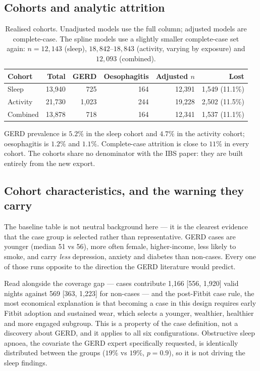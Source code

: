 \documentclass[11pt]{article}
\begin{document}
\subsection{Cohorts and analytic attrition}
\begin{table}[h]
\centering
\footnotesize
\begin{tabular}{@{}lrrrrr@{}}
\toprule
\textbf{Cohort} & \textbf{Total} & \textbf{GERD} & \textbf{Oesophagitis} & \textbf{Adjusted $n$} & \textbf{Lost} \\
\midrule
Sleep    & 13{,}940 & 725     & 164 & 12{,}391 & 1{,}549 (11.1\%) \\
Activity & 21{,}730 & 1{,}023 & 244 & 19{,}228 & 2{,}502 (11.5\%) \\
Combined & 13{,}878 & 718     & 164 & 12{,}341 & 1{,}537 (11.1\%) \\
\bottomrule
\end{tabular}
\caption{Realised cohorts. Unadjusted models use the full column; adjusted models are
complete-case. The spline models use a slightly smaller complete-case set again: $n=12{,}143$
(sleep), $18{,}842$--$18{,}843$ (activity, varying by exposure) and $12{,}093$ (combined).}
\end{table}

\noindent GERD prevalence is $5.2\%$ in the sleep cohort and $4.7\%$ in the activity cohort;
oesophagitis is $1.2\%$ and $1.1\%$. Complete-case attrition is close to $11\%$ in every cohort.
The cohorts share no denominator with the IBS paper: they are built entirely from the new export.

\subsection{Cohort characteristics, and the warning they carry}
\label{sec:res-t1s}
The baseline table is not neutral background here --- it is the clearest evidence that the case
group is selected rather than representative. GERD cases are younger (median 51 vs 56), more often
female, higher-income, less likely to smoke, and carry \emph{less} depression, anxiety and diabetes
than non-cases. Every one of those runs opposite to the direction the GERD literature would
predict.

Read alongside the coverage gap --- cases contribute 1{,}166 [556, 1{,}920] valid nights against
569 [363, 1{,}223] for non-cases --- and the post-Fitbit case rule, the most economical explanation
is that becoming a case in this design requires early Fitbit adoption and sustained wear, which
selects a younger, wealthier, healthier and more engaged subgroup. This is a property of the case
definition, not a discovery about GERD, and it applies to all six configurations. Obstructive sleep
apnoea, the covariate the GERD expert specifically requested, is identically distributed between
the groups ($19\%$ vs $19\%$, $p=0.9$), so it is not driving the sleep findings.
\end{document}

